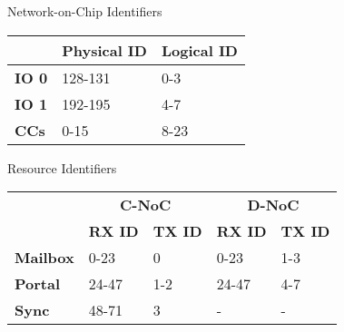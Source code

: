 \begin{backup}

	\begin{frame}[fragile]{Network-on-Chip Identifiers}
		\begin{table}
			\centering%
			\begin{tabular}{l|l|l|}
				\cline{2-3}
													& \textbf{Physical ID} & \textbf{Logical ID} \\ \hline
				\multicolumn{1}{|l|}{\textbf{IO 0}} & 128-131              & 0-3                 \\ \hline
				\multicolumn{1}{|l|}{\textbf{IO 1}} & 192-195              & 4-7                 \\ \hline
				\multicolumn{1}{|l|}{\textbf{CCs}}  & 0-15                 & 8-23                \\ \hline
			\end{tabular}
		\end{table}

	\end{frame}

	\begin{frame}[fragile]{Resource Identifiers}
		\begin{table}
			\centering%
			\begin{tabular}{l|l|l|l|l|}
				\cline{2-5}
														& \multicolumn{2}{c|}{\textbf{C-NoC}} & \multicolumn{2}{c|}{\textbf{D-NoC}} \\ \cline{2-5}
														& \textbf{RX ID} & \textbf{TX ID}     & \textbf{RX ID}  & \textbf{TX ID}    \\ \hline
				\multicolumn{1}{|l|}{\textbf{Mailbox}} & 0-23           & 0                  & 0-23            & 1-3               \\ \hline
				\multicolumn{1}{|l|}{\textbf{Portal}}  & 24-47          & 1-2                & 24-47           & 4-7               \\ \hline
				\multicolumn{1}{|l|}{\textbf{Sync}}    & 48-71          & 3                  & -               & -                 \\ \hline
			\end{tabular}
		\end{table}


\end{frame}
\end{backup}
